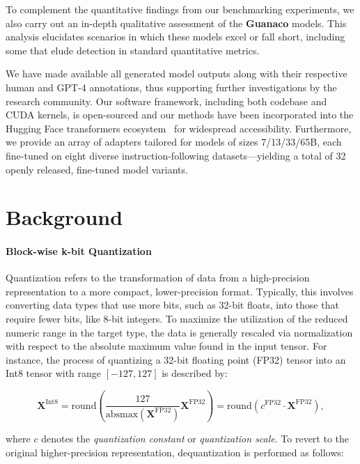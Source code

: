 To complement the quantitative findings from our benchmarking experiments, we also carry out an in-depth qualitative assessment of the \textbf{Guanaco} models. This analysis elucidates scenarios in which these models excel or fall short, including some that elude detection in standard quantitative metrics.

We have made available all generated model outputs along with their respective human and GPT-4 annotations, thus supporting further investigations by the research community. Our software framework, including both codebase and CUDA kernels, is open-sourced and our methods have been incorporated into the Hugging Face transformers ecosystem~\citep{wolf2019huggingface} for widespread accessibility. Furthermore, we provide an array of adapters tailored for models of sizes 7/13/33/65B, each fine-tuned on eight diverse instruction-following datasets—yielding a total of 32 openly released, fine-tuned model variants.

\section{Background}
\paragraph{Block-wise k-bit Quantization} Quantization refers to the transformation of data from a high-precision representation to a more compact, lower-precision format. Typically, this involves converting data types that use more bits, such as 32-bit floats, into those that require fewer bits, like 8-bit integers. To maximize the utilization of the reduced numeric range in the target type, the data is generally rescaled via normalization with respect to the absolute maximum value found in the input tensor. For instance, the process of quantizing a 32-bit floating point (FP32) tensor into an Int8 tensor with range $[-127, 127]$ is described by:

\begin{equation}
    \mathbf{X}^{ \text{Int8}} = \text{round}\left( \frac{127}{{\text{absmax}}(\mathbf{X}^{{\text{FP32}}})}\mathbf{X}^{{\text{FP32}}} \right) = \text{round}(c^{\text{FP32}}\cdot \mathbf{X}^{{\text{FP32}}}),
\end{equation}

where $c$ denotes the {\em quantization constant} or {\em quantization scale}. To revert to the original higher-precision representation, dequantization is performed as follows:

